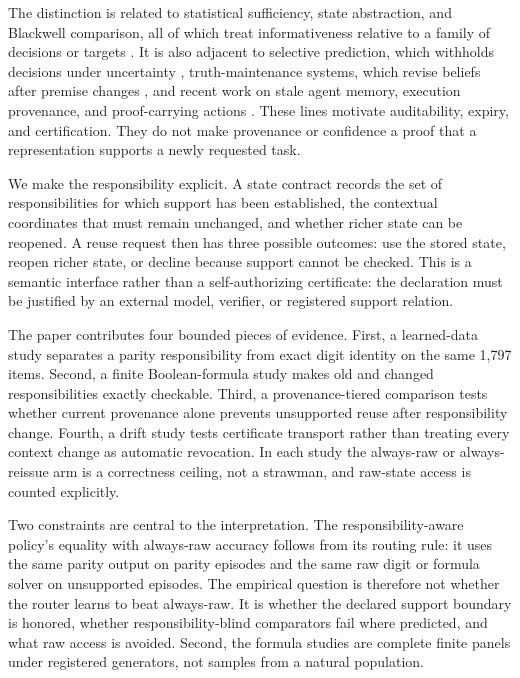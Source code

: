 \documentclass[10pt]{article}
\begin{document}
The distinction is related to statistical sufficiency, state abstraction, and Blackwell comparison, all of which treat informativeness relative to a family of decisions or targets \citep{blackwell1953equivalent,li2006unified,ravindran2004approximate}. It is also adjacent to selective prediction, which withholds decisions under uncertainty \citep{geifman2017selective}, truth-maintenance systems, which revise beliefs after premise changes \citep{doyle1979truth}, and recent work on stale agent memory, execution provenance, and proof-carrying actions \citep{chao2026stale,wang2026traces,wang2026proof}. These lines motivate auditability, expiry, and certification. They do not make provenance or confidence a proof that a representation supports a newly requested task.

We make the responsibility explicit. A state contract records the set of responsibilities for which support has been established, the contextual coordinates that must remain unchanged, and whether richer state can be reopened. A reuse request then has three possible outcomes: use the stored state, reopen richer state, or decline because support cannot be checked. This is a semantic interface rather than a self-authorizing certificate: the declaration must be justified by an external model, verifier, or registered support relation.

The paper contributes four bounded pieces of evidence. First, a learned-data study separates a parity responsibility from exact digit identity on the same 1,797 items. Second, a finite Boolean-formula study makes old and changed responsibilities exactly checkable. Third, a provenance-tiered comparison tests whether current provenance alone prevents unsupported reuse after responsibility change. Fourth, a drift study tests certificate transport rather than treating every context change as automatic revocation. In each study the always-raw or always-reissue arm is a correctness ceiling, not a strawman, and raw-state access is counted explicitly.

Two constraints are central to the interpretation. The responsibility-aware policy's equality with always-raw accuracy follows from its routing rule: it uses the same parity output on parity episodes and the same raw digit or formula solver on unsupported episodes. The empirical question is therefore not whether the router learns to beat always-raw. It is whether the declared support boundary is honored, whether responsibility-blind comparators fail where predicted, and what raw access is avoided. Second, the formula studies are complete finite panels under registered generators, not samples from a natural population.
\end{document}

